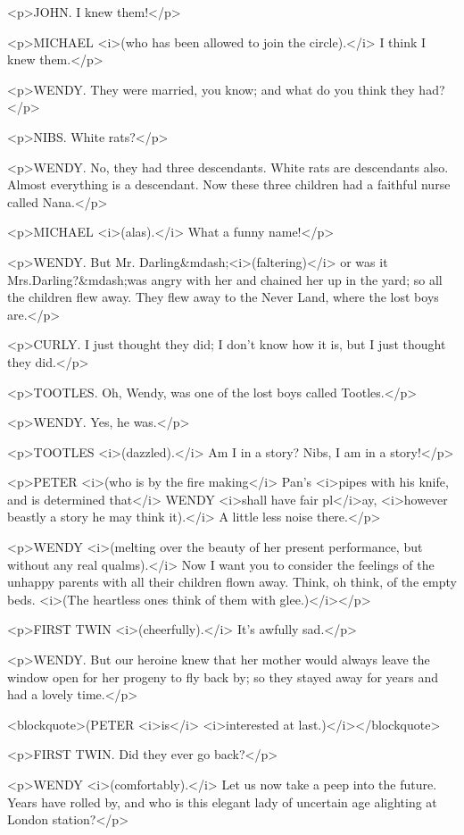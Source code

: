 <p>JOHN. I knew them!</p>

<p>MICHAEL <i>(who has been allowed to join the circle).</i> I think
I knew them.</p>

<p>WENDY. They were married, you know; and what do you think they
had?</p>

<p>NIBS. White rats?</p>

<p>WENDY. No, they had three descendants. White rats are descendants
also. Almost everything is a descendant. Now these three children had
a faithful nurse called Nana.</p>

<p>MICHAEL <i>(alas).</i> What a funny name!</p>

<p>WENDY. But Mr. Darling&mdash;<i>(faltering)</i> or was it
Mrs.Darling?&mdash;was angry with her and chained her up in the yard;
so all the children flew away. They flew away to the Never Land,
where the lost boys are.</p>

<p>CURLY. I just thought they did; I don't know how it is, but I just
thought they did.</p>

<p>TOOTLES. Oh, Wendy, was one of the lost boys called Tootles.</p>

<p>WENDY. Yes, he was.</p>

<p>TOOTLES <i>(dazzled).</i> Am I in a story? Nibs, I am in a
story!</p>

<p>PETER <i>(who is by the fire making</i> Pan's <i>pipes with his
knife, and is determined that</i> WENDY <i>shall have fair pl</i>ay,
<i>however beastly a story he may think it).</i> A little less noise
there.</p>

<p>WENDY <i>(melting over the beauty of her present performance, but
without any real qualms).</i> Now I want you to consider the feelings
of the unhappy parents with all their children flown away. Think, oh
think, of the empty beds. <i>(The heartless ones think of them with
glee.)</i></p>

<p>FIRST TWIN <i>(cheerfully).</i> It's awfully sad.</p>

<p>WENDY. But our heroine knew that her mother would always leave the
window open for her progeny to fly back by; so they stayed away for
years and had a lovely time.</p>

<blockquote>(PETER <i>is</i> <i>interested at last.)</i></blockquote>

<p>FIRST TWIN. Did they ever go back?</p>

<p>WENDY <i>(comfortably).</i> Let us now take a peep into the
future. Years have rolled by, and who is this elegant lady of
uncertain age alighting at London station?</p>

